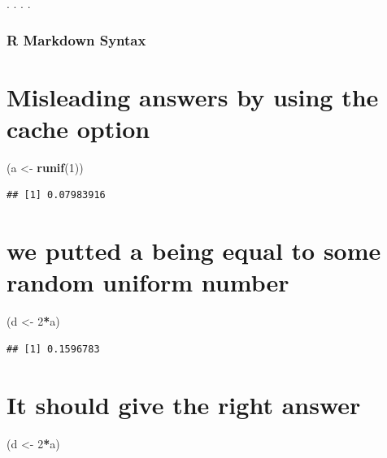 \documentclass[]{article}
\newenvironment{Shaded}{\begin{snugshade}}{\end{snugshade}}
\newcommand{\KeywordTok}[1]{\textcolor[rgb]{0.13,0.29,0.53}{\textbf{#1}}}
\newcommand{\DecValTok}[1]{\textcolor[rgb]{0.00,0.00,0.81}{#1}}
\newcommand{\StringTok}[1]{\textcolor[rgb]{0.31,0.60,0.02}{#1}}
\newcommand{\OperatorTok}[1]{\textcolor[rgb]{0.81,0.36,0.00}{\textbf{#1}}}
\newcommand{\NormalTok}[1]{#1}
\begin{document}
. . . .

\subsubsection{R Markdown Syntax}\label{r-markdown-syntax}

\section{Misleading answers by using the cache
option}\label{misleading-answers-by-using-the-cache-option}

\begin{Shaded}
\begin{Highlighting}[]
\NormalTok{(a <-}\StringTok{ }\KeywordTok{runif}\NormalTok{(}\DecValTok{1}\NormalTok{))}
\end{Highlighting}
\end{Shaded}

\begin{verbatim}
## [1] 0.07983916
\end{verbatim}

\section{we putted a being equal to some random uniform
number}\label{we-putted-a-being-equal-to-some-random-uniform-number}

\begin{Shaded}
\begin{Highlighting}[]
\NormalTok{(d <-}\StringTok{ }\DecValTok{2}\OperatorTok{*}\NormalTok{a)}
\end{Highlighting}
\end{Shaded}

\begin{verbatim}
## [1] 0.1596783
\end{verbatim}

\section{It should give the right
answer}\label{it-should-give-the-right-answer}

\begin{Shaded}
\begin{Highlighting}[]
\NormalTok{(d <-}\StringTok{ }\DecValTok{2}\OperatorTok{*}\NormalTok{a)}
\end{Highlighting}
\end{Shaded}
\end{document}
